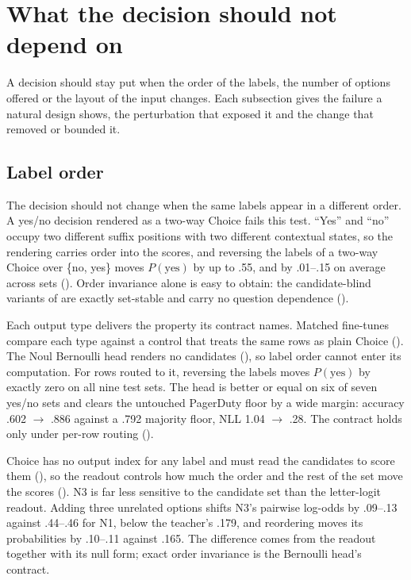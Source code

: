 \section{What the decision should not depend on}
\label{sec:invariant}
\label{sec:results}

A decision should stay put when the order of the labels, the number of options offered or the layout of
the input changes. Each subsection gives the failure a natural design shows, the perturbation that
exposed it and the change that removed or bounded it.

\subsection{Label order}
\label{sec:results:typed}

The decision should not change when the same labels appear in a different order. A yes/no decision
rendered as a two-way Choice fails this test. ``Yes'' and ``no'' occupy two different suffix positions
with two different contextual states, so the rendering carries order into the scores, and reversing the
labels of a two-way Choice over \{no, yes\} moves $P(\text{yes})$ by up to .55, and by .01--.15 on
average across sets (). Order invariance alone is easy to obtain: the candidate-blind variants of
 are exactly set-stable and carry no question dependence
().

Each output type delivers the property its contract names. Matched fine-tunes compare each type
against a control that treats the same rows as plain Choice (). The Noul
Bernoulli head renders no candidates (), so label order cannot enter its
computation. For rows routed to it, reversing the labels
moves $P(\text{yes})$ by exactly zero on all nine test sets. The head is better or equal on six of seven
yes/no sets and clears the untouched PagerDuty floor by a wide margin: accuracy .602 $\to$ .886 against a
.792 majority floor, NLL 1.04 $\to$ .28. The contract holds only under per-row routing ().

Choice has no output index for any label and must read the candidates to score them
(), so the readout controls how much the order and the rest of the set move the
scores (). N3 is far less sensitive to the
candidate set than the letter-logit readout. Adding three unrelated options shifts N3's pairwise
log-odds by .09--.13 against .44--.46 for N1, below the teacher's .179, and reordering moves its
probabilities by .10--.11 against .165. The difference comes from the readout together with its null
form; exact order invariance is the Bernoulli head's contract.

